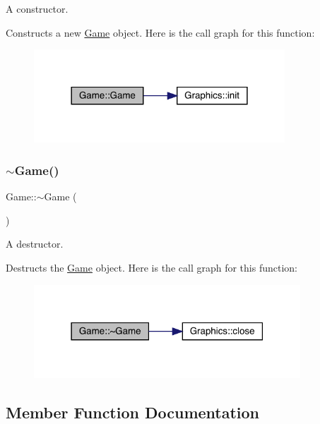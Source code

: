 A constructor. 

Constructs a new \mbox{\hyperlink{class_game}{Game}} object. Here is the call graph for this function\+:\nopagebreak
\begin{figure}[H]
\begin{center}
\leavevmode
\includegraphics[width=266pt]{class_game_ad59df6562a58a614fda24622d3715b65_cgraph}
\end{center}
\end{figure}
\mbox{\label{class_game_ae3d112ca6e0e55150d2fdbc704474530}} 
\subsubsection{\texorpdfstring{$\sim$\+Game()}{~Game()}}
{\footnotesize\ttfamily Game\+::$\sim$\+Game (\begin{DoxyParamCaption}{ }\end{DoxyParamCaption})}



A destructor. 

Destructs the \mbox{\hyperlink{class_game}{Game}} object. Here is the call graph for this function\+:\nopagebreak
\begin{figure}[H]
\begin{center}
\leavevmode
\includegraphics[width=283pt]{class_game_ae3d112ca6e0e55150d2fdbc704474530_cgraph}
\end{center}
\end{figure}


\subsection{Member Function Documentation}
\mbox{\label{class_game_a741532226fb50fd8113b0e2a0f162858}} 
